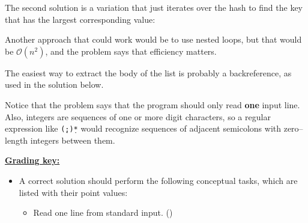 \documentclass[11pt,fleqn]{article}
\begin{document}
\begin{enumerate}
          The second solution is a variation that just iterates over the
          hash to find the key that has the largest corresponding value:

          Another approach that could work would be to use nested loops, but
          that would be $\mathcal{O}(n^2)$, and the problem says that
          efficiency matters.

          The easiest way to extract the body of the list is probably a
          backreference, as used in the solution below.

          Notice that the problem says that the program should only read
          \textbf{one} input line.  Also, integers are sequences of one or
          more digit characters, so a regular expression like
          \texttt{\string\d*(;\string\d*)*} would recognize sequences of
          adjacent semicolons with zero--length integers between them.

          \vspace{-.5mm}


          \medskip

          \enlargethispage{8mm}


          \vspace{-2.5mm}

          \begin{info}{\textbf{\underline{Grading key:}}}

            \begin{itemize}

              \addtolength{\itemsep}{2mm}

              \item A correct solution should perform the following
                    conceptual tasks, which are listed with their point
                    values:

                    \smallskip

                    \begin{itemize}

                      \addtolength{\itemsep}{0mm}

                      \renewcommand{\labelitemii}{$\ast$}

                      \item Read one line from standard input.
                            ()


\end{itemize}
\end{itemize}
\end{info}
\end{enumerate}
\end{document}
